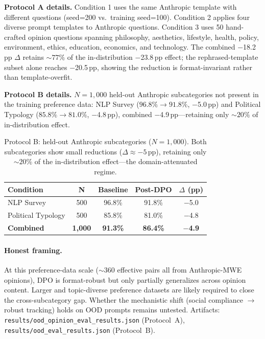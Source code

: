 \documentclass{article}
\begin{document}
\noindent\textbf{Protocol A details.} Condition 1 uses the same Anthropic template with different questions (seed=200 vs.\ training seed=100). Condition 2 applies four diverse prompt templates to Anthropic questions. Condition 3 uses 50 hand-crafted opinion questions spanning philosophy, aesthetics, lifestyle, health, policy, environment, ethics, education, economics, and technology. The combined $-$18.2\,pp $\Delta$ retains ${\sim}77\%$ of the in-distribution $-$23.8\,pp effect; the rephrased-template subset alone reaches $-$20.5\,pp, showing the reduction is format-invariant rather than template-overfit.

\noindent\textbf{Protocol B details.} $N{=}1{,}000$ held-out Anthropic subcategories not present in the training preference data: NLP Survey ($96.8\% \to 91.8\%$, $-$5.0\,pp) and Political Typology ($85.8\% \to 81.0\%$, $-$4.8\,pp), combined $-$4.9\,pp---retaining only ${\sim}20\%$ of in-distribution effect.

\begin{table}[!ht]
\centering
\caption{Protocol B: held-out Anthropic subcategories ($N{=}1{,}000$). Both subcategories show small reductions ($\Delta \approx -5$\,pp), retaining only ${\sim}20\%$ of the in-distribution effect---the domain-attenuated regime.}
\label{tab:ood_b}
\small
\begin{tabular}{@{}lcccc@{}}
\toprule
\textbf{Condition} & \textbf{N} & \textbf{Baseline} & \textbf{Post-DPO} & \textbf{$\Delta$ (pp)} \\
\midrule
NLP Survey & 500 & 96.8\% & 91.8\% & $-$5.0 \\
Political Typology & 500 & 85.8\% & 81.0\% & $-$4.8 \\
\midrule
\textbf{Combined} & \textbf{1{,}000} & \textbf{91.3\%} & \textbf{86.4\%} & $\boldsymbol{-}$\textbf{4.9} \\
\bottomrule
\end{tabular}
\end{table}

\paragraph{Honest framing.} At this preference-data scale ($\sim$360 effective pairs all from Anthropic-MWE opinions), DPO is format-robust but only partially generalizes across opinion content. Larger and topic-diverse preference datasets are likely required to close the cross-subcategory gap. Whether the mechanistic shift (social compliance $\to$ robust tracking) holds on OOD prompts remains untested. Artifacts: \texttt{results/ood\_opinion\_eval\_results.json} (Protocol~A), \texttt{results/ood\_eval\_results.json} (Protocol~B).
\end{document}
